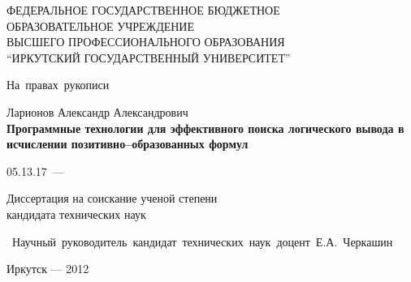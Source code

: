 \documentclass[a4paper]{report}
\begin{document}
\begin{titlepage}
\begin{center}
ФЕДЕРАЛЬНОЕ ГОСУДАРСТВЕННОЕ БЮДЖЕТНОЕ \\
ОБРАЗОВАТЕЛЬНОЕ УЧРЕЖДЕНИЕ \\
ВЫСШЕГО ПРОФЕССИОНАЛЬНОГО ОБРАЗОВАНИЯ\\
``ИРКУТСКИЙ ГОСУДАРСТВЕННЫЙ УНИВЕРСИТЕТ''
\end{center}
\vspace{1cm}
\hfill{\vbox{\hbox{На правах рукописи}}}
\vspace{1cm}
\begin{center}
    Ларионов Александр Александрович \\
    \vspace{0.5cm}
{\bf Программные технологии для эффективного поиска логического вывода в исчислении позитивно--образованных формул}
\end{center}
\vfill
\hfil\hbox{\hbox{05.13.17 --- }
    \hbox{}%
}\hfil
\vspace{1cm}
\begin{center}
    Диссертация на соискание ученой степени \\
    кандидата технических наук
\end{center}
\vfill
\hfill\hbox{\vbox{
    \hbox{Научный руководитель}
    \hbox{кандидат технических наук}
    \hbox{доцент~Е.А.~Черкашин}
}}%
\vfill
\begin{center}
{Иркутск --- 2012}
\end{center}
\end{titlepage}

%
\def\namepc{\hbox{$\rm\mu{}$PrISM}}

\newpage

\tableofcontents

\newpage










\label{pg:main}

\label{pg:total}
\end{document}
